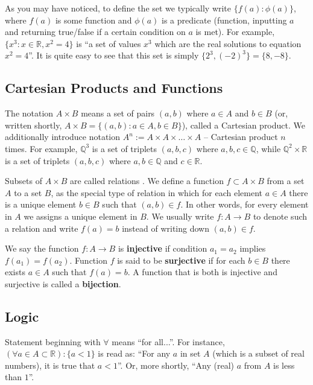\documentclass[../lecture-notes-148x210.tex]{subfiles}
\begin{document}
As you may have noticed, to define the set we typically write $\{f(a): \phi(a)\}$, where $f(a)$ is some 
function and $\phi(a)$ is a predicate (function, inputting $a$ and returning true/false if a certain condition 
on $a$ is met). For example, $\{x^3: x \in \mathbb{R}, x^2 = 4\}$ is ``a set of values $x^3$ which are the real 
solutions to equation $x^2 = 4$''. It is quite easy to see that this set is simply $\{2^3, (-2)^3\} = \{8,-8\}$. 

\subsection*{Cartesian Products and Functions}

The notation $A \times B$ means a set of pairs $(a,b)$ where $a \in A$ and $b \in B$ (or, written shortly, 
$A \times B = \{(a,b): a \in A, b \in B\}$), called a Cartesian product. We additionally introduce notation 
$A^n := A \times A \times \dots \times A$ -- Cartesian product $n$ times. For example, $\mathbb{Q}^3$ is a set of triplets 
$(a,b,c)$ where $a,b,c \in \mathbb{Q}$, while $\mathbb{Q}^2 \times \mathbb{R}$ is a set of triplets $(a,b,c)$ where 
$a,b \in \mathbb{Q}$ and $c \in \mathbb{R}$.

Subsets of $ A \times B$ are called relations \cite[section 1]{Judson_2012}. We
define a function $f \subset A \times B$ from a set $A$ to a set $B$, as the
special type of relation in which for each element $a \in A$ there is a unique
element $b \in B$ such that $(a, b) \in f$. In other words, for every element in
$A$ we assigns a unique element in $B$. We usually write $f : A \to B$ to denote
such a relation and write $f(a) = b$ instead of writing down $(a,b) \in f$.

We say the function $f : A \to B$ is \textbf{injective} if condition $a_1 = a_2$ implies
$f(a_1) = f(a_2)$. Function $f$ is said to be \textbf{surjective} if for each 
$b \in B$ there exists $a \in A$ such that $f(a) = b$. A function that is both
is injective and surjective is called a \textbf{bijection}.


\subsection*{Logic}

Statement beginning with $\forall$ means ``for all...''. For instance, $(\forall a \in A \subset \mathbb{R}): \{a < 1\}$ is 
read as: ``For any $a$ in set $A$ (which is a subset of real numbers), it is true that $a<1$''. Or, more shortly, ``Any (real) 
$a$ from $A$ is less than $1$''.
\end{document}
